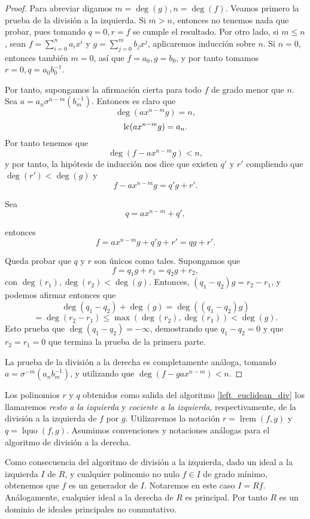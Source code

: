 \begin{proof}
Para abreviar digamos \(m = \deg(g), n = \deg(f)\). Veamos primero la prueba de la división a la izquierda. Si \(m > n\), entonces no tenemos nada que probar, pues tomando  \(q = 0, r = f\) se cumple el resultado. Por otro lado, si \(m \leq n\), sean \(f = \sum_{i=0}^{n} a_i x^i\) y \(g = \sum_{j=0}^{m} b_j x^j\), aplicaremos inducción sobre \(n\). Si \(n = 0\), entonces también \(m = 0\), así que  \(f = a_0, g = b_0\), y por tanto tomamos \(r = 0, q = a_0 b_0^{-1}\).

Por tanto, supongamos la afirmación cierta para todo \(f\) de grado menor que \(n\).  Sea \(a = a_n \sigma^{n-m}(b_m^{-1})\). Entonces es claro que
\[
\deg(ax^{n-m}g) = n,
\]
\[
\operatorname{lc}(ax^{n-m}g) = a_n
.\]
Por tanto tenemos que
\[
\deg(f - a x^{n-m}g) < n,
\]
y por tanto, la hipótesis de inducción nos dice que existen \(q'\) y \(r'\) compliendo que \(\deg(r') < \deg(g)\)  y
\[
f - a x^{n-m}g = q'g + r'
.\]

Sea
\[
q = a x^{n-m} + q'
,\]

entonces
\[
f = a x^{n-m}g + q'g + r' = qg + r'
.\]

Queda probar que \(q\) y \(r\) son únicos como tales. Supongamos que
\[
f = q_1g + r_1 = q_2g + r_2,
\]
con \(\deg(r_1), \deg(r_2) < \deg(g)\). Entonces, \((q_1 - q_2)g = r_2 - r_1\), y podemos afirmar entonces que
\[
\deg(q_1 - q_2) + \deg(g) = \deg((q_1-q_2)g)
\]
\[
= \deg(r_2-r_1) \leq \max(\deg(r_2), \deg(r_1)) < \deg(g)
.\]
Esto prueba que \(\deg(q_1-q_2) = -\infty\), demostrando que \(q_1 - q_2 = 0\) y que \(r_2 = r_1 = 0\) que termina la prueba de la primera parte.

La prueba de la división a la derecha es completamente análoga, tomando \(a = \sigma^{-m}(a_{n}b_{m}^{-1})\), y utilizando que \(\deg(f - gax^{n-m}) < n\).

\end{proof}

Los polinomios \(r\) y \(q\) obtenidos como salida del algoritmo \ref{left_euclidean_div} los llamaremos \textit{resto a la izquierda} y  \textit{cociente a la izquierda}, respectivamente, de la división a la izquierda de \(f\) por \(g\). Utilizaremos la notación \(r = \operatorname{lrem}(f,g)\) y \(q = \operatorname{lquo}(f,g)\). Asumimos convenciones y notaciones análogas para el algoritmo de división a la derecha.

Como consecuencia del algoritmo de división a la izquierda, dado un ideal a la izquierda \(I\) de \(R\), y cualquier polinomio no nulo  \(f \in I\) de grado mínimo, obtenemos que  \(f\) es un generador de  \(I\). Notaremos en este caso \(I = Rf\). Análogamente, cualquier ideal a la derecha de \(R\) es principal.  Por tanto \(R\) es un dominio de ideales principales no conmutativo.


